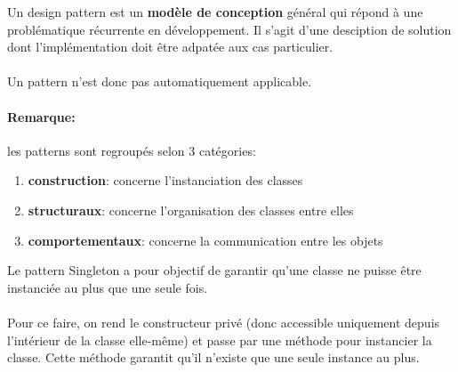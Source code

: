 \item{}
{\faux}
{Un design pattern est un \textbf{modèle de conception} général qui répond à une problématique récurrente en développement. Il s'agit d'une desciption de solution dont l'implémentation doit être adpatée aux cas particulier.
\paragraph{}Un pattern n'est donc pas automatiquement applicable.

\paragraph{Remarque:} les patterns sont regroupés selon 3 catégories:
\begin{enumerate}
\item \textbf{construction}: concerne l'instanciation des classes
\item \textbf{structuraux}: concerne l'organisation des classes entre elles
\item \textbf{comportementaux}: concerne la communication entre les objets
\end{enumerate}
}

\item{}
{\faux}
{Le pattern Singleton a pour objectif de garantir qu'une classe ne puisse être instanciée au plus que une seule fois.
\paragraph{}
Pour ce faire, on rend le constructeur privé (donc accessible uniquement depuis l'intérieur de la classe elle-même) et passe par une méthode pour instancier la classe. Cette méthode garantit qu'il n'existe que une seule instance au plus.
}

